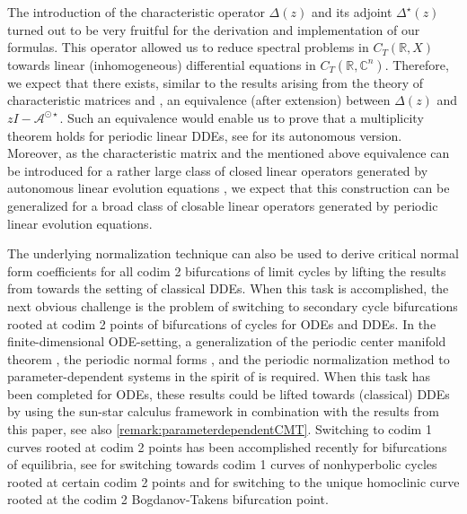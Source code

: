 \documentclass[english]{myarticle}
\begin{document}
\begin{sloppypar}
The introduction of the characteristic operator $\Delta(z)$ and its adjoint $\Delta^\star(z)$ turned out to be very fruitful for the derivation and implementation of our formulas. This  operator allowed us to reduce spectral problems in $C_T(\mathbb{R},X)$ towards linear (inhomogeneous) differential equations in $C_T(\mathbb{R},\mathbb{C}^n)$. Therefore, we expect that there exists, similar to the results arising from the theory of characteristic matrices \cite[Theorem II.1.2]{Kaashoek1992} and \cite[Theorem IV.5.1]{Diekmann1995}, an equivalence (after extension) between $\Delta(z)$ and $zI - \mathcal{A}^{\odot \star}$. Such an equivalence would enable us to prove that a multiplicity theorem holds for periodic linear DDEs, see \cite[Theorem I.2.1]{Kaashoek1992} for its autonomous version. Moreover, as the characteristic matrix and the mentioned above equivalence can be introduced for a rather large class of closed linear operators generated by autonomous linear evolution equations \cite[Section I.3]{Kaashoek1992}, we expect that this construction can be generalized for a broad class of closable linear operators generated by periodic linear evolution equations.

The underlying normalization technique can also be used to derive critical normal form coefficients for all codim 2 bifurcations of limit cycles by lifting the results from \cite{Witte2014,Witte2013} towards the setting of classical DDEs. When this task is accomplished, the next obvious challenge is the problem of switching to secondary cycle bifurcations rooted at codim 2 points of bifurcations of cycles for ODEs and DDEs. In the finite-dimensional ODE-setting, a generalization of the periodic center manifold theorem \cite{LentjesCMODE}, the periodic normal forms \cite{Iooss1988,Iooss1999}, and the periodic normalization method \cite{Kuznetsov2005,Witte2013,Witte2014} to parameter-dependent systems in the spirit of \cite{Govaerts2007,Kuznetsov2008,Bosschaert2024} is required. When this task has been completed for ODEs, these results could be lifted towards (classical) DDEs by using the sun-star calculus framework in combination with the results from this paper, see also \cref{remark:parameterdependentCMT}. Switching to codim 1 curves rooted at codim 2 points has been accomplished recently for bifurcations of equilibria, see \cite{Bosschaert2020} for switching towards codim 1 curves of nonhyperbolic cycles rooted at certain codim 2 points and \cite{Bosschaert2024a} for switching to the unique homoclinic curve rooted at the codim 2 Bogdanov-Takens bifurcation point.


\end{sloppypar}
\end{document}
